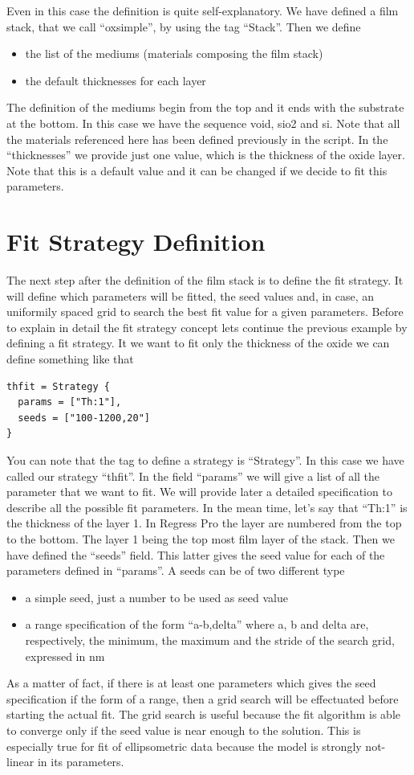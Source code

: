 \documentclass[a4paper]{report}
\begin{document}
Even in this case the definition is quite self-explanatory. We have
defined a film stack, that we call ``oxsimple'', by using the tag
``Stack''. Then we define
\begin{itemize}
  \item the list of the mediums (materials composing the film stack)
  \item the default thicknesses for each layer
\end{itemize}
The definition of the mediums begin from the top and it ends with the
substrate at the bottom. In this case we have the sequence void, sio2
and si. Note that all the materials referenced here has been defined
previously in the script. In the ``thicknesses'' we provide just one
value, which is the thickness of the oxide layer. Note that this is a
default value and it can be changed if we decide to fit this
parameters.

\section{Fit Strategy Definition}
The next step after the definition of the film stack is to define the
fit strategy. It will define which parameters will be fitted, the seed
values and, in case, an uniformily spaced grid to search the best fit
value for a given parameters. Before to explain in detail the fit
strategy concept lets continue the previous example by defining a fit
strategy. It we want to fit only the thickness of the oxide we can
define something like that
\begin{verbatim}
thfit = Strategy {
  params = ["Th:1"],
  seeds = ["100-1200,20"]
}
\end{verbatim}
You can note that the tag to define a strategy is ``Strategy''. In
this case we have called our strategy ``thfit''. In the field
``params'' we will give a list of all the parameter that we want to
fit. We will provide later a detailed specification to describe all
the possible fit parameters. In the mean time, let's say that ``Th:1''
is the thickness of the layer 1. In Regress Pro the layer are numbered
from the top to the bottom. The layer 1 being the top most film layer
of the stack. Then we have defined the ``seeds'' field. This latter
gives the seed value for each of the parameters defined in
``params''. A seeds can be of two different type
\begin{itemize}
  \item a simple seed, just a number to be used as seed value
  \item a range specification of the form ``a-b,delta'' where a, b and
  delta are, respectively, the minimum, the maximum and the stride of
  the search grid, expressed in nm
\end{itemize}
As a matter of fact, if there is at least one parameters which gives
the seed specification if the form of a range, then a grid search will
be effectuated before starting the actual fit. The grid search is
useful because the fit algorithm is able to converge only if the seed
value is near enough to the solution. This is especially true for fit
of ellipsometric data because the model is strongly not-linear in its
parameters.
\end{document}
